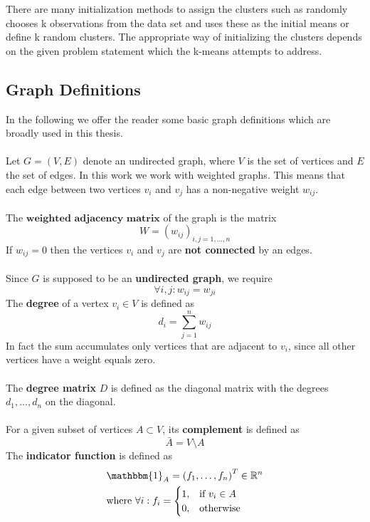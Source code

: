 There are many initialization methods to assign the clusters such as randomly chooses k observations from the data set and uses these as the initial means or define k random clusters. The appropriate way of initializing the clusters depends on the given problem statement which the k-means attempts to address. 

\subsection{Graph Definitions}
In the following we offer the reader some basic graph definitions which are broadly used in this thesis. \\ \\ 
Let $G = (V, E)$ denote an undirected graph, where $V$ is the set of vertices and $E$ the set of edges. In this work we work with weighted graphs. This means that each edge between two vertices $v_i$ and $v_j$ has a non-negative weight $w_{ij}$. \\ \\
The $\textbf{weighted adjacency matrix}$ of the graph is the matrix 
\begin{equation}
W = \left( w_{ij} \right)_{i,j=1,\dots, n}	
\end{equation}
If $w_{ij} = 0$ then the vertices $v_i$ and $v_j$ are \textbf{not connected} by an edges. \\ \\
Since $G$ is supposed to be an \textbf{undirected graph}, we require
\begin{equation}
	\forall i,j : w_{ij} = w_{ji}
\end{equation}
The \textbf{degree} of a vertex $v_i \in V$ is defined as
\begin{equation}
	d_i = \sum_{j=1}^n w_{ij}
\end{equation}
In fact the sum accumulates only vertices that are adjacent to $v_i$, since all other vertices have a weight equals zero. \\ \\
The \textbf{degree matrix} $D$ is defined as the diagonal matrix with the degrees $d_1,\dots, d_n$ on the diagonal. \\ \\
For a given subset of vertices $A \subset V$, its \textbf{complement} is defined as
\begin{equation}
	\bar{A} = V \setminus A
\end{equation}
The \textbf{indicator function} is defined as
\begin{equation}
\begin{aligned}
& \mathbbm{1}_A = \left( f_1, \dots, f_n \right)^{T} \in \mathbb{R}^n \\
& \text{where } \forall i: f_i= 
\begin{cases}
    1,& \text{if } v_i\in A\\
    0,              & \text{otherwise}
\end{cases}
\end{aligned}
\end{equation}
